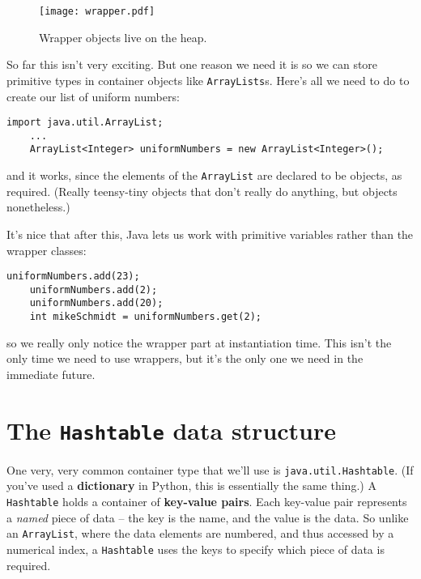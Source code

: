 \begin{figure}[ht]
\centering
\texttt{[image: wrapper.pdf]}  %
\caption{Wrapper objects live on the heap.}
\label{fig:wrapper}
\end{figure}

So far this isn't very exciting. But one reason we need it is so we can store
primitive types in container objects like \texttt{ArrayLists}s. Here's all we
need to do to create our list of uniform numbers:

\begin{Verbatim}[fontsize=\small,samepage=true]
    import java.util.ArrayList;
    ...
    ArrayList<Integer> uniformNumbers = new ArrayList<Integer>();
\end{Verbatim}

and it works, since the elements of the \texttt{ArrayList} are declared to be
objects, as required. (Really teensy-tiny objects that don't really do
anything, but objects nonetheless.)

It's nice that after this, Java lets us work with primitive variables rather
than the wrapper classes:

\begin{Verbatim}[fontsize=\small,samepage=true]
    uniformNumbers.add(23);
    uniformNumbers.add(2);
    uniformNumbers.add(20);
    int mikeSchmidt = uniformNumbers.get(2);
\end{Verbatim}

so we really only notice the wrapper part at instantiation time. This isn't
the only time we need to use wrappers, but it's the only one we need in the
immediate future.

\section{The \texttt{Hashtable} data structure}
\label{sec:hashtable}

One very, very common container type that we'll use is
\texttt{java.util.Hashtable}. (If you've used a \textbf{dictionary} in Python,
this is essentially the same thing.) A \texttt{Hashtable} holds a container of
\textbf{key-value pairs}. Each key-value pair represents a \textit{named}
piece of data -- the key is the name, and the value is the data. So unlike an
\texttt{ArrayList}, where the data elements are numbered, and thus accessed by
a numerical index, a \texttt{Hashtable} uses the keys to specify which piece
of data is required.

